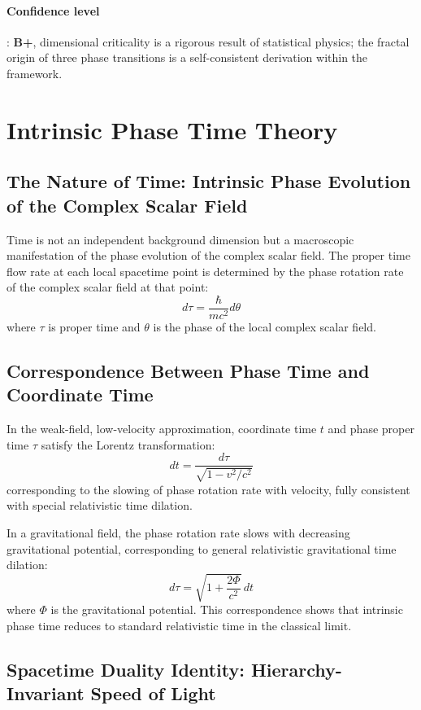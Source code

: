 \documentclass[12pt,a4paper,twocolumn]{article}
\begin{document}
\paragraph{Confidence level}: \textbf{B+}, dimensional criticality is a rigorous result of statistical physics; the fractal origin of three phase transitions is a self-consistent derivation within the framework.

\section{Intrinsic Phase Time Theory}

\subsection{The Nature of Time: Intrinsic Phase Evolution of the Complex Scalar Field}
Time is not an independent background dimension but a macroscopic manifestation of the phase evolution of the complex scalar field. The proper time flow rate at each local spacetime point is determined by the phase rotation rate of the complex scalar field at that point:
\[
d\tau = \frac{\hbar}{mc^2} d\theta
\]
where $\tau$ is proper time and $\theta$ is the phase of the local complex scalar field.

\subsection{Correspondence Between Phase Time and Coordinate Time}
In the weak-field, low-velocity approximation, coordinate time $t$ and phase proper time $\tau$ satisfy the Lorentz transformation:
\[
dt = \frac{d\tau}{\sqrt{1-v^2/c^2}}
\]
corresponding to the slowing of phase rotation rate with velocity, fully consistent with special relativistic time dilation.

In a gravitational field, the phase rotation rate slows with decreasing gravitational potential, corresponding to general relativistic gravitational time dilation:
\[
d\tau = \sqrt{1+\frac{2\Phi}{c^2}}\,dt
\]
where $\Phi$ is the gravitational potential. This correspondence shows that intrinsic phase time reduces to standard relativistic time in the classical limit.

\subsection{Spacetime Duality Identity: Hierarchy-Invariant Speed of Light}
\label{subsec:spacetime_duality}
\end{document}
